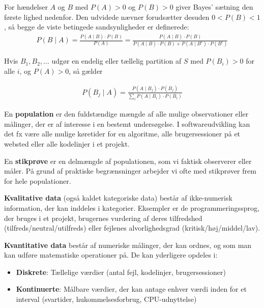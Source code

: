 \begin{theorem}
    For hændelser $A$ og $B$ med $P(A)>0$ og $P(B)>0$ giver Bayes' sætning den første lighed nedenfor. Den udvidede nævner forudsætter desuden $0<P(B)<1$, så begge de viste betingede sandsynligheder er definerede:
    \begin{align*}
    P(B \mid A) = \frac{P(A \mid B) \cdot P(B)}{P(A)}
     = \frac{P(A \mid B) \cdot P(B)}{P(A \mid B) \cdot P(B) + P(A \mid B^c) \cdot P(B^c)}
    \end{align*}

    Hvis $B_1,B_2,\ldots$ udgør en endelig eller tællelig partition af $S$ med $P(B_i)>0$ for alle $i$, og $P(A)>0$, så gælder

    \begin{align*}
    P\left(B_j \mid A\right) = \frac{P\left(A \mid B_j\right) \cdot P\left(B_j\right)}{\sum_i P\left(A \mid B_i\right) \cdot P\left(B_i\right)}
    \end{align*}
\end{theorem}


\begin{definition}[Population]
En \textbf{population} er den fuldstændige mængde af alle mulige observationer eller målinger, der er af interesse i en bestemt undersøgelse. I softwareudvikling kan det fx være alle mulige køretider for en algoritme, alle brugersessioner på et websted eller alle kodelinjer i et projekt.
\end{definition}

\begin{definition}[Stikprøve]
En \textbf{stikprøve} er en delmængde af populationen, som vi faktisk observerer eller måler. På grund af praktiske begrænsninger arbejder vi ofte med stikprøver frem for hele populationer.
\end{definition}

\begin{definition}
\textbf{Kvalitative data} (også kaldet kategoriske data) består af ikke-numerisk information, der kan inddeles i kategorier. Eksempler er de programmeringssprog, der bruges i et projekt, brugernes vurdering af deres tilfredshed (tilfreds/neutral/utilfreds) eller fejlenes alvorlighedsgrad (kritisk/høj/middel/lav).
\end{definition}

\begin{definition}
\textbf{Kvantitative data} består af numeriske målinger, der kan ordnes, og som man kan udføre matematiske operationer på. De kan yderligere opdeles i:
\begin{itemize}
    \item \textbf{Diskrete}: Tællelige værdier (antal fejl, kodelinjer, brugersessioner)
    \item \textbf{Kontinuerte}: Målbare værdier, der kan antage enhver værdi inden for et interval (svartider, hukommelsesforbrug, CPU-udnyttelse)
\end{itemize}
\end{definition}

